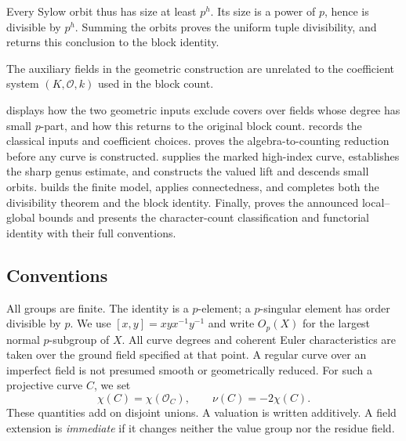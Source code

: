 Every Sylow orbit thus has size at least $p^h$. Its size is a power
of $p$, hence is divisible by $p^h$. Summing the orbits proves the
uniform tuple divisibility, and  returns
this conclusion to the block identity.

The auxiliary fields in the geometric construction are unrelated to the
coefficient system $(K,\mathcal O,k)$ used in the block count.

 displays how the two geometric inputs exclude
covers over fields whose degree has small $p$-part, and how this returns to the original
block count.  records the classical inputs and
coefficient choices.  proves the algebra-to-counting
reduction before any curve is constructed.  supplies the
marked high-index curve,  establishes the sharp
genus estimate, and  constructs the valued lift and
descends small orbits.  builds the finite model,
applies connectedness, and completes both the divisibility theorem and
the block identity. Finally,  proves the announced
local--global bounds and presents the character-count classification and
functorial identity with their full conventions.



\subsection*{Conventions}

All groups are finite. The identity is a $p$-element; a $p$-singular element has order divisible by $p$. We use $[x,y]=xyx^{-1}y^{-1}$ and write $O_p(X)$ for the largest normal $p$-subgroup of $X$. All curve degrees and coherent Euler characteristics are taken over the ground field specified at that point. A regular curve over an imperfect field is not presumed smooth or geometrically reduced. For such a projective curve $C$, we set
\[
 \chi(C)=\chi(\mathcal O_C),\qquad \nu(C)=-2\chi(C).
\]
These quantities add on disjoint unions. A valuation is written additively. A field extension is \emph{immediate} if it changes neither the value group nor the residue field.
